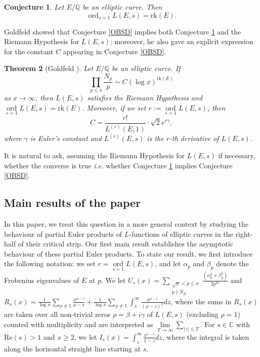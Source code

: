 \documentclass[12pt,reqno]{amsart}
\newtheorem{theorem}{Theorem}[section]
\newtheorem{conjecture}[theorem]{Conjecture}
\theoremstyle{definition}
\numberwithin{equation}{section}
\newcommand{\rk}{\mathrm{rk}}
\newcommand{\ord}{\mathop{\mathrm{ord}}}
\renewcommand{\Re}{\mathrm{Re}}
\begin{document}
\begin{conjecture} \label{BSD}
Let $E/\mathbb Q$ be an elliptic curve. 
Then
$$
\ord_{s=1} L(E, s)= \rk (E). 
$$
\end{conjecture}

Goldfeld \cite{Goldfeld1982} showed that Conjecture \ref{OBSD} implies both Conjecture \ref{BSD} and the Riemann Hypothesis for $L(E, s)$; moreover, he also gave an explicit expression for the constant $C$ appearing in Conjecture \ref{OBSD}.  

\begin{theorem}[Goldfeld \cite{Goldfeld1982}]
Let $E/\mathbb Q$ be an elliptic curve. If 
$$
\prod_{p \leq x} \frac{N_p}{p}  \sim C (\log x)^{\rk (E) }
$$
as $x \to \infty$, then $L(E, s)$ satisfies the Riemann Hypothesis and $\ord \limits _{s=1} L(E, s)= \rk(E)$. Moreover, if we set $r:=\ord \limits _{s=1}L(E,s )$,  then 
$$
C= \frac{r!}{L^{(r)} (E, 1) } \cdot \sqrt 2 e^{r \gamma}, 
$$
where $\gamma$ is  Euler's constant and $L^{(r)}(E, s)$ is the $r$-th derivative of $L(E, s)$.  

\end{theorem}
It is natural to ask, assuming the Riemann Hypothesis for $L(E, s)$ if necessary, whether the converse is true \textit{i.e.} whether Conjecture \ref{BSD} implies Conjecture \ref{OBSD}. 




\subsection{Main results of the paper}
In this paper, we treat this question in a more general context by studying the behaviour of partial Euler products of $L$-functions of elliptic curves in the right-half of their critical strip. Our first main result establishes the asymptotic behaviour of these partial Euler products. 
To state our result, we first introduce the following notation: we set $r=\ord \limits_{s=1} L(E, s)$,  and let $\alpha_p$ and $\beta_p$ denote the Frobenius eigenvalues of $E$ at $p$. We let $ U_s(x)= \sum \limits _{\substack{\sqrt x < p \leq x \\ p \nmid  N_E}} \frac{(\alpha_p^2+\beta_p^2) }{2p^{2s}} $ and $
 R_s(x) = \frac{1}{\log x} \sum \limits_{ \rho \neq 1 } \frac{x^{\rho-s}}{ \rho-s}+ \frac{1}{ \log x} \sum \limits_{\rho \neq 1} \int_{s}^{\infty} \frac{x^{\rho-z}}{(\rho-z)^2}dz$, where the sums in $R_s(x)$ are taken over all non-trivial zeros $\rho=\beta+i \gamma$ of $L(E, s)$ (excluding $\rho=1$) counted with multiplicity and are interpreted as $\lim \limits_{T \to \infty} \sum \limits  _{ |\gamma| \leq T}$. For $s \in \mathbb C$ with $\Re(s)>1$ and $x \geq 2$, we let $I_s(x)= \int_{s}^{\infty} \frac{x^{1-z}}{1-z} dz$,  where the integral is taken along the horizontal straight line starting at $s$. 
\end{document}
